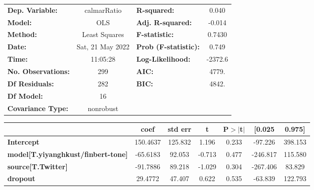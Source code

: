 \begin{center}
\begin{tabular}{lclc}
\toprule
\textbf{Dep. Variable:}                    &   calmarRatio    & \textbf{  R-squared:         } &     0.040   \\
\textbf{Model:}                            &       OLS        & \textbf{  Adj. R-squared:    } &    -0.014   \\
\textbf{Method:}                           &  Least Squares   & \textbf{  F-statistic:       } &    0.7430   \\
\textbf{Date:}                             & Sat, 21 May 2022 & \textbf{  Prob (F-statistic):} &    0.749    \\
\textbf{Time:}                             &     11:05:28     & \textbf{  Log-Likelihood:    } &   -2372.6   \\
\textbf{No. Observations:}                 &         299      & \textbf{  AIC:               } &     4779.   \\
\textbf{Df Residuals:}                     &         282      & \textbf{  BIC:               } &     4842.   \\
\textbf{Df Model:}                         &          16      & \textbf{                     } &             \\
\textbf{Covariance Type:}                  &    nonrobust     & \textbf{                     } &             \\
\bottomrule
\end{tabular}
\begin{tabular}{lcccccc}
                                           & \textbf{coef} & \textbf{std err} & \textbf{t} & \textbf{P$> |$t$|$} & \textbf{[0.025} & \textbf{0.975]}  \\
\midrule
\textbf{Intercept}                         &     150.4637  &      125.832     &     1.196  &         0.233        &      -97.226    &      398.153     \\
\textbf{model[T.yiyanghkust/finbert-tone]} &     -65.6183  &       92.053     &    -0.713  &         0.477        &     -246.817    &      115.580     \\
\textbf{source[T.Twitter]}                 &     -91.7886  &       89.218     &    -1.029  &         0.304        &     -267.406    &       83.829     \\
\textbf{dropout}                           &      29.4772  &       47.407     &     0.622  &         0.535        &      -63.839    &      122.793     \\

\end{tabular}
\end{center}
